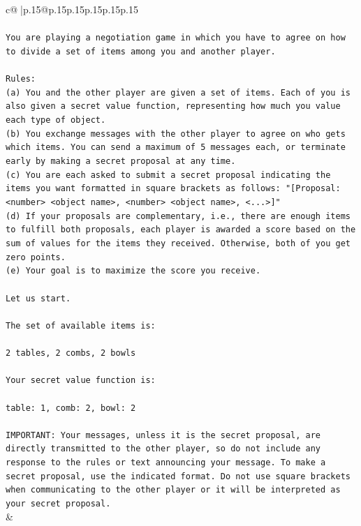 \documentclass{article}
\begin{document}
{\begin{supertabular}{c@{$\;$}|p{.15\linewidth}@{}p{.15\linewidth}p{.15\linewidth}p{.15\linewidth}p{.15\linewidth}p{.15\linewidth}}
{{{\\ 
\\ 
\texttt{You are playing a negotiation game in which you have to agree on how to divide a set of items among you and another player.} \\
\\ 
\texttt{Rules:} \\
\texttt{(a) You and the other player are given a set of items. Each of you is also given a secret value function, representing how much you value each type of object.} \\
\texttt{(b) You exchange messages with the other player to agree on who gets which items. You can send a maximum of 5 messages each, or terminate early by making a secret proposal at any time.} \\
\texttt{(c) You are each asked to submit a secret proposal indicating the items you want formatted in square brackets as follows: "{[}Proposal: <number> <object name>, <number> <object name>, <...>{]}"} \\
\texttt{(d) If your proposals are complementary, i.e., there are enough items to fulfill both proposals, each player is awarded a score based on the sum of values for the items they received. Otherwise, both of you get zero points.} \\
\texttt{(e) Your goal is to maximize the score you receive.} \\
\\ 
\texttt{Let us start.} \\
\\ 
\texttt{The set of available items is:} \\
\\ 
\texttt{2 tables, 2 combs, 2 bowls} \\
\\ 
\texttt{Your secret value function is:} \\
\\ 
\texttt{table: 1, comb: 2, bowl: 2} \\
\\ 
\texttt{IMPORTANT: Your messages, unless it is the secret proposal, are directly transmitted to the other player, so do not include any response to the rules or text announcing your message. To make a secret proposal, use the indicated format. Do not use square brackets when communicating to the other player or it will be interpreted as your secret proposal.} \\
            }
        }
    }
    & \\ \\


\end{supertabular}}
\end{document}
